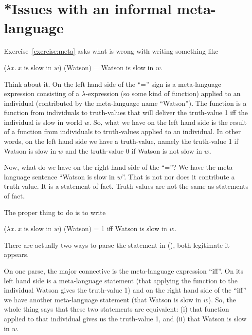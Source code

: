 \section{*Issues with an informal meta-language}
\label{sec:meta-issues}

Exercise~\ref{exercise:meta} asks what is wrong with writing something like%
%

\ex ($\lambda x.\ x \mbox{ is slow in } w$) (Watson) = Watson is slow
in $w$.\label{ex:badwatson} \xe

Think about it. On the left hand side of the ``='' sign is a meta-language
expression consisting of a $\lambda$-expression (so some kind of function)
applied to an individual (contributed by the meta-language name ``Watson''). The
function is a function from individuals to truth-values that will deliver the
truth-value 1 iff the individual is slow in world $w$. So, what we have on the
left hand side is the result of a function from individuals to truth-values
applied to an individual. In other words, on the left hand side we have a
truth-value, namely the truth-value 1 if Watson is slow in $w$ and the
truth-value 0 if Watson is not slow in $w$.

Now, what do we have on the right hand side of the ``=''? We have the
meta-language sentence ``Watson is slow in $w$''. That is not nor does it
contribute a truth-value. It is a statement of fact. Truth-values are not the
same as statements of fact.

\kwn The proper thing to do is to write

\ex ($\lambda x.\ x \mbox{ is slow in } w$) (Watson) = 1 iff Watson
is slow in $w$.\label{ex:goodwatson} \xe

There are actually two ways to parse the statement in (\lastx), both legitimate
it appears.

On one parse, the major connective is the meta-language expression ``iff''. On
its left hand side is a meta-language statement (that applying the function to
the individual Watson gives the truth-value 1) and on the right hand side of the
``iff'' we have another meta-language statement (that Watson is slow in $w$).
So, the whole thing says that these two statements are equivalent: (i) that
function applied to that individual gives us the truth-value 1, and (ii) that
Watson is slow in $w$.

